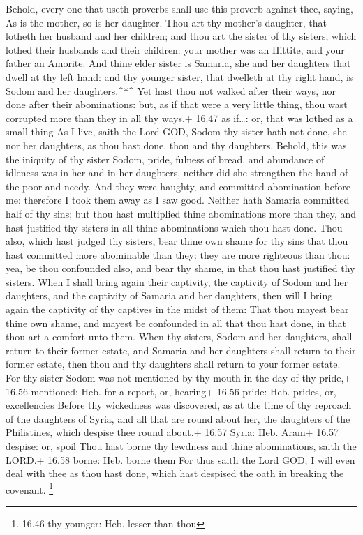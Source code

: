  Behold, every one that useth proverbs shall use this
proverb against thee, saying, As is the mother, so is her daughter.
 Thou art thy mother's daughter, that lotheth her husband
and her children; and thou art the sister of thy sisters, which lothed
their husbands and their children: your mother was an Hittite, and your
father an Amorite.  And thine elder sister is Samaria, she
and her daughters that dwell at thy left hand: and thy younger sister,
that dwelleth at thy right hand, is Sodom and her daughters.\^{}*\^{}
 Yet hast thou not walked after their ways, nor done after
their abominations: but, as if that were a very little thing, thou wast
corrupted more than they in all thy ways.+ 16.47 as if\ldots: or, that
was lothed as a small thing  As I live, saith the Lord GOD,
Sodom thy sister hath not done, she nor her daughters, as thou hast
done, thou and thy daughters.  Behold, this was the
iniquity of thy sister Sodom, pride, fulness of bread, and abundance of
idleness was in her and in her daughters, neither did she strengthen the
hand of the poor and needy.  And they were haughty, and
committed abomination before me: therefore I took them away as I saw
good.  Neither hath Samaria committed half of thy sins; but
thou hast multiplied thine abominations more than they, and hast
justified thy sisters in all thine abominations which thou hast done.
 Thou also, which hast judged thy sisters, bear thine own
shame for thy sins that thou hast committed more abominable than they:
they are more righteous than thou: yea, be thou confounded also, and
bear thy shame, in that thou hast justified thy sisters. 
When I shall bring again their captivity, the captivity of Sodom and her
daughters, and the captivity of Samaria and her daughters, then will I
bring again the captivity of thy captives in the midst of them:
 That thou mayest bear thine own shame, and mayest be
confounded in all that thou hast done, in that thou art a comfort unto
them.  When thy sisters, Sodom and her daughters, shall
return to their former estate, and Samaria and her daughters shall
return to their former estate, then thou and thy daughters shall return
to your former estate.  For thy sister Sodom was not
mentioned by thy mouth in the day of thy pride,+ 16.56 mentioned: Heb.
for a report, or, hearing+ 16.56 pride: Heb. prides, or, excellencies
 Before thy wickedness was discovered, as at the time of
thy reproach of the daughters of Syria, and all that are round about
her, the daughters of the Philistines, which despise thee round about.+
16.57 Syria: Heb. Aram+ 16.57 despise: or, spoil  Thou hast
borne thy lewdness and thine abominations, saith the LORD.+ 16.58 borne:
Heb. borne them  For thus saith the Lord GOD; I will even
deal with thee as thou hast done, which hast despised the oath in
breaking the covenant. \footnote{16.46 thy younger: Heb. lesser than
  thou}

